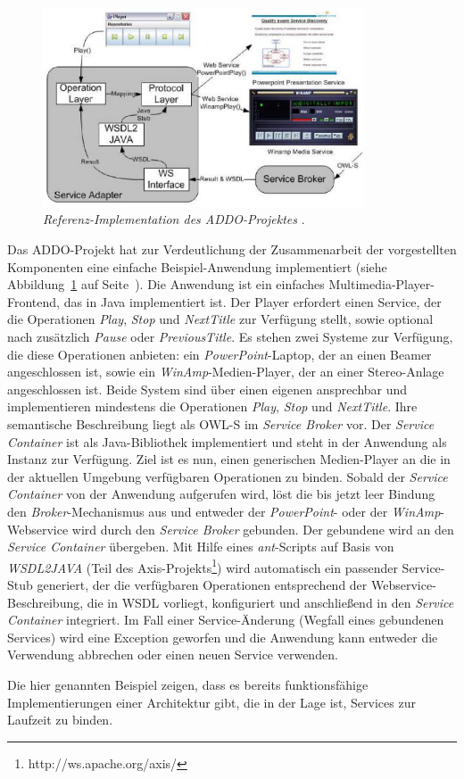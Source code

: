 \begin{figure}[ht]
\centering
\parbox{0.85\textwidth}{
    \includegraphics[width=0.85\textwidth]{media/addo-player-example.png}
    \caption{\emph{Referenz-Implementation des \ac{ADDO}-Projektes} \cite[S.418]{flexbrok}.}
    \label{f:addo-player}
}
\end{figure}

Das \ac{ADDO}-Projekt hat zur Verdeutlichung der Zusammenarbeit der vorgestellten Komponenten eine einfache Beispiel-Anwendung implementiert (siehe Abbildung~\ref{f:addo-player} auf Seite~\pageref{f:addo-player}). Die Anwendung ist ein einfaches Multimedia-Player-Frontend, das in Java implementiert ist. Der Player erfordert einen Service, der die Operationen \emph{Play}, \emph{Stop} und \emph{NextTitle} zur Verfügung stellt, sowie optional nach zusätzlich \emph{Pause} oder \emph{PreviousTitle}. Es stehen zwei Systeme zur Verfügung, die diese Operationen anbieten: ein \emph{PowerPoint}-Laptop, der an einen Beamer angeschlossen ist, sowie ein \emph{WinAmp}-Medien-Player, der an einer Stereo-Anlage angeschlossen ist. Beide System sind über einen eigenen \ws ansprechbar und implementieren mindestens die Operationen \emph{Play}, \emph{Stop} und \emph{NextTitle}. Ihre semantische Beschreibung liegt als \ac{OWL-S} im \emph{Service Broker} vor. Der \emph{Service Container} ist als Java-Bibliothek implementiert und steht in der Anwendung als Instanz zur Verfügung. Ziel ist es nun, einen generischen Medien-Player an die in der aktuellen Umgebung verfügbaren Operationen zu binden. Sobald der \emph{Service Container} von der Anwendung aufgerufen wird, löst die bis jetzt leer Bindung den \emph{Broker}-Mechanismus aus und entweder der \emph{PowerPoint}- oder der \emph{WinAmp}-Webservice wird durch den \emph{Service Broker} gebunden. Der gebundene wird an den \emph{Service Container} übergeben. Mit Hilfe eines \emph{ant}-Scripts auf Basis von \emph{WSDL2JAVA} (Teil des Axis-Projekts\footnote{http://ws.apache.org/axis/}) wird automatisch ein passender Service-Stub generiert, der die verfügbaren Operationen entsprechend der Webservice-Beschreibung, die in \ac{WSDL} vorliegt, konfiguriert und anschließend in den \emph{Service Container} integriert. Im Fall einer Service-Änderung (Wegfall eines gebundenen Services) wird eine Exception geworfen und die Anwendung kann entweder die Verwendung abbrechen oder einen neuen Service verwenden.

Die hier genannten Beispiel zeigen, dass es bereits funktionsfähige Implementierungen einer Architektur gibt, die in der Lage ist, Services zur Laufzeit zu binden.